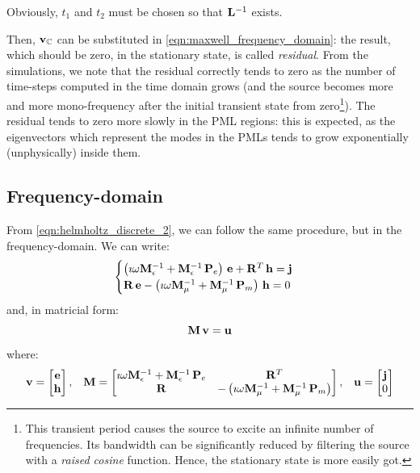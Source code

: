 Obviously, $t_1$ and $t_2$ must be chosen so that $\mathbf{L}^{-1}$ exists.

Then, $\mathbf{v}_{\mathbb{C}}$ can be substituted in
\eqref{eqn:maxwell_frequency_domain}: the result, which should be
zero, in the stationary state, is called \emph{residual}. From the
simulations, we note that the residual correctly tends to zero as the
number of time-steps computed in the time domain grows (and the source
becomes more and more mono-frequency after the initial transient state
from zero\footnote{This transient period causes the source to excite
  an infinite number of frequencies. Its bandwidth can be significantly
  reduced by filtering the source with a \emph{raised cosine}
  function. Hence, the stationary state is more easily got.}). The
residual tends to zero more slowly in the PML regions: this is
expected, as the eigenvectors which represent the modes in the PMLs
tends to grow exponentially (unphysically) inside them.


\subsection{Frequency-domain}

From \eqref{eqn:helmholtz_discrete_2}, we can follow the same
procedure, but in the frequency-domain. We can write:
\begin{equation*} \begin{cases}
    {\left( \imath \omega \mathbf{M}_\epsilon^{-1} +
    {\mathbf{M}_\epsilon^{-1}\,\mathbf{P}_e} \right)\,\mathbf{e}}
    + {{\mathbf{R}}^T\,\mathbf{h}} = \mathbf{j} \\
    {\mathbf{R}\,\mathbf{e}} -
    {\left( \imath \omega \mathbf{M}_\mu^{-1} +
    {\mathbf{M}_\mu^{-1}\,\mathbf{P}_m} \right)\,\mathbf{h}} = 0
\end{cases} \end{equation*}
and, in matricial form:
\begin{equation} \label{eqn:eigval_fd_1}
  {\mathbf{M}\,\mathbf{v}} = \mathbf{u}
\end{equation}
where:
\begin{align*}
  \mathbf{v} = \begin{bmatrix} \mathbf{e} \\ \mathbf{h} \end{bmatrix}, &&
  \mathbf{M} = \begin{bmatrix}
    \imath \omega \mathbf{M}_\epsilon^{-1} +
    {\mathbf{M}_\epsilon^{-1}\,\mathbf{P}_e} &
    {\mathbf{R}}^T \\
    \mathbf{R} &
    - \left( \imath \omega \mathbf{M}_\mu^{-1} +
  {\mathbf{M}_\mu^{-1}\,\mathbf{P}_m} \right)
  \end{bmatrix}, &&
  \mathbf{u} = \begin{bmatrix} \mathbf{j} \\ 0 \end{bmatrix}
\end{align*}

